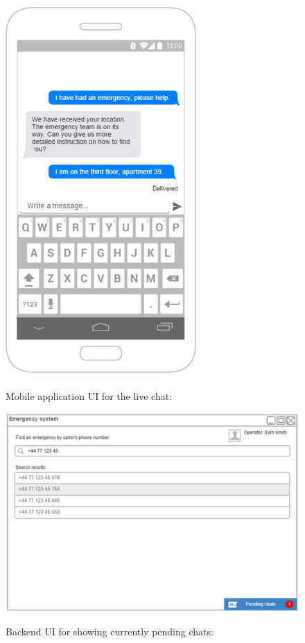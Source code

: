 \documentclass{article}
\begin{document}
	
	\begin{figure}[h]
		\centering
		\includegraphics[width=.6\textwidth]{"Chat/2"}

	Mobile application UI for the live chat:
	\end{figure} \clearpage
	
	
	\begin{figure}[h]
	\vspace{-30pt}
		\centering
		\includegraphics[width=.8\textwidth]{"Chat/3"}

		Backend UI for showing currently pending chats:
	\end{figure} 
	
\end{document}
